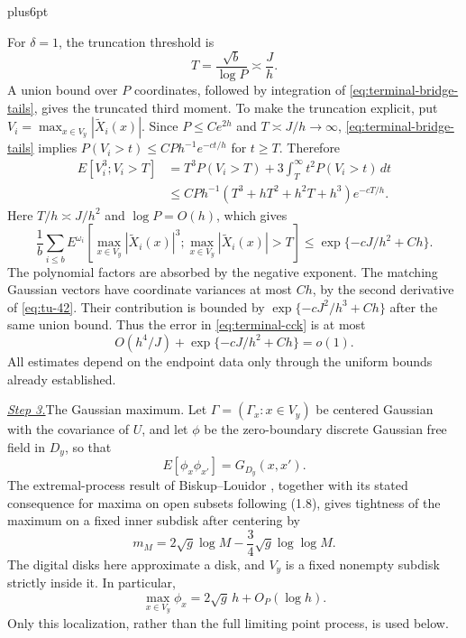 \documentclass[12pt,reqno]{amsart}
\makeatletter
\theoremstyle{plain}
\theoremstyle{definition}
\theoremstyle{remark}
\renewenvironment{proof}[1][\proofname]{%
  \par
  \pushQED{\qed}%
  \normalfont
  \topsep6pt plus6pt\relax
  \trivlist
  \item[\hskip\labelsep\slshape #1\@addpunct{.}]%
  \ignorespaces
}{%
  \popQED
  \endtrivlist
  \@endpefalse
}
\DeclareRobustCommand{\qed}{%
  \leavevmode\unskip\penalty9999\hbox{}\nobreak
  \ifmmode
    \makebox[0pt][l]{\qquad\hbox{\qedsymbol}}%
  \else
    \qquad\hbox{\qedsymbol}%
  \fi
}
\renewcommand{\qedsymbol}{\rule[.47pt]{4pt}{6pt}}
\numberwithin{equation}{section}
\makeatother
\begin{document}
\begin{proof}
For $\delta=1$, the truncation threshold is
\[
 T=\frac{\sqrt b}{\log P}\asymp\frac Jh.
\]
A union bound over $P$ coordinates, followed by integration of
\eqref{eq:terminal-bridge-tails}, gives the truncated third moment. To
make the truncation explicit, put
$V_i=\max_{x\in V_y}|\widetilde X_i(x)|$. Since $P\le Ce^{2h}$ and
$T\asymp J/h\to\infty$, \eqref{eq:terminal-bridge-tails} implies
$P(V_i>t)\le CP h^{-1}e^{-ct/h}$ for $t\ge T$. Therefore
\[
\begin{aligned}
 E[V_i^3;V_i>T]
 &=T^3P(V_i>T)+3\int_T^\infty t^2P(V_i>t)\,dt\\
 &\le CP h^{-1}(T^3+hT^2+h^2T+h^3)e^{-cT/h}.
\end{aligned}
\]
Here $T/h\asymp J/h^2$ and $\log P=O(h)$, which gives
\begin{equation}
 \frac1b\sum_{i\le b}E^{\omega_i}\left[
   \max_{x\in V_y}|\widetilde X_i(x)|^3;
   \max_{x\in V_y}|\widetilde X_i(x)|>T\right]
 \le \exp\{-cJ/h^2+Ch\}.
 \label{eq:terminal-truncated-third-moment}
\end{equation}
The polynomial factors are absorbed by the negative exponent. The
matching Gaussian vectors have coordinate variances
at most $Ch$, by the second derivative of \eqref{eq:tu-42}.  Their contribution
is bounded by $\exp\{-cJ^2/h^3+Ch\}$ after the same union bound.
Thus the error in \eqref{eq:terminal-cck} is at most
\begin{equation}
 O(h^4/J)+\exp\{-cJ/h^2+Ch\}=o(1).
 \label{eq:terminal-cck-error}
\end{equation}
All estimates depend on the endpoint data only through the uniform
bounds already established.

\smallskip\noindent
\underline{\textit{Step 3.}}\quad The Gaussian maximum.
Let $\Gamma=(\Gamma_x:x\in V_y)$ be centered Gaussian with the
covariance of $U$, and let $\phi$ be the zero-boundary discrete
Gaussian free field in $D_y$, so that
\[
 E[\phi_x\phi_{x'}]=G_{D_y}(x,x').
\]
The extremal-process result of Biskup--Louidor
\cite[(1.2), (1.6), and Theorem~2.1]{BiskupLouidor2018}, together
with its stated consequence for maxima on open subsets following
(1.8), gives tightness of the maximum on a fixed inner subdisk after
centering by
\[
 m_M=2\sqrt g\log M-\frac34\sqrt g\log\log M.
\]
The digital disks here approximate a disk, and $V_y$ is a fixed
nonempty subdisk strictly inside it.  In particular,
\begin{equation}
 \max_{x\in V_y}\phi_x=2\sqrt g\,h+O_P(\log h).
 \label{eq:terminal-dgff-maximum}
\end{equation}
Only this localization, rather than the full limiting point process,
is used below.


\end{proof}
\end{document}
